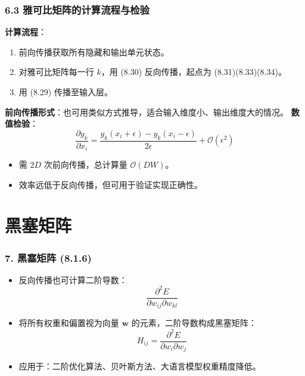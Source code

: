 \documentclass[t,aspectratio=169]{beamer} %
\begin{document}
\begin{frame}
    \frametitle{6.3 雅可比矩阵的计算流程与检验}
    \textbf{计算流程}：
    \begin{enumerate}
        \item 前向传播获取所有隐藏和输出单元状态。
        \item 对雅可比矩阵每一行 $k$，用 (8.30) 反向传播，起点为 (8.31)(8.33)(8.34)。
        \item 用 (8.29) 传播至输入层。
    \end{enumerate}
    \textbf{前向传播形式}：也可用类似方式推导，适合\alert{输入维度小、输出维度大}的情况。
    \vspace{0.5em}
    \textbf{数值检验}：
    \begin{equation}
        \frac{\partial y_k}{\partial x_i} = \frac{y_k(x_i + \epsilon) - y_k(x_i - \epsilon)}{2\epsilon} + \mathcal{O}(\epsilon^2)
        \tag{8.35}
    \end{equation}
    \begin{itemize}
        \item 需 $2D$ 次前向传播，总计算量 $\mathcal{O}(DW)$。
        \item 效率远低于反向传播，但可用于\alert{验证实现正确性}。
    \end{itemize}
\end{frame}

\section{黑塞矩阵}

\begin{frame}
    \frametitle{7. 黑塞矩阵 (8.1.6)}
    \begin{itemize}
        \item 反向传播也可计算\alert{二阶导数}：
        \begin{equation}
            \frac{\partial^2 E}{\partial w_{ij} \partial w_{kl}}
            \tag{8.36}
        \end{equation}
        \item 将所有权重和偏置视为向量 $\mathbf{w}$ 的元素，二阶导数构成\alert{黑塞矩阵}：
        \begin{equation}
            H_{ij} = \frac{\partial^2 E}{\partial w_i \partial w_j}
            \tag{8.37}
        \end{equation}
        \item 应用于：\alert{二阶优化算法}、\alert{贝叶斯方法}、\alert{大语言模型权重精度降低}。
    \end{itemize}
\end{frame}
\end{document}
